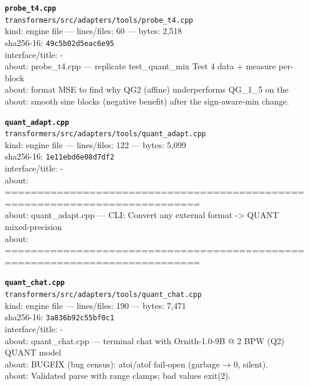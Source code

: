 \noindent\textbf{\texttt{probe\_t4.cpp}}\\
\texttt{transformers/src/adapters/tools/probe\_t4.cpp}\\
kind: engine file --- lines/files: 60 --- bytes: 2,518\\
sha256-16: \texttt{49c5b02d5eac6e95}\\
interface/title: -\\
about: probe\_t4.cpp — replicate test\_quant\_mix Test 4 data + measure per-block\\
about: format MSE to find why QG2 (affine) underperforms QG\_1\_5 on the\\
about: smooth sine blocks (negative benefit) after the sign-aware-min change.\\
\vspace*{6.0pt}
\newpage

\noindent\textbf{\texttt{quant\_adapt.cpp}}\\
\texttt{transformers/src/adapters/tools/quant\_adapt.cpp}\\
kind: engine file --- lines/files: 122 --- bytes: 5,099\\
sha256-16: \texttt{1e11ebd6e08d7df2}\\
interface/title: -\\
about: ============================================================================\\
about: quant\_adapt.cpp — CLI: Convert any external format -> QUANT mixed-precision\\
about: ============================================================================\\
\vspace*{6.0pt}

\noindent\textbf{\texttt{quant\_chat.cpp}}\\
\texttt{transformers/src/adapters/tools/quant\_chat.cpp}\\
kind: engine file --- lines/files: 190 --- bytes: 7,471\\
sha256-16: \texttt{3a836b92c55bf0c1}\\
interface/title: -\\
about: quant\_chat.cpp — terminal chat with Ornith-1.0-9B @ 2 BPW (Q2) QUANT model\\
about: BUGFIX (bug census): atoi/atof fail-open (garbage → 0, silent).\\
about: Validated parse with range clamps; bad values exit(2).\\
\vspace*{6.0pt}

